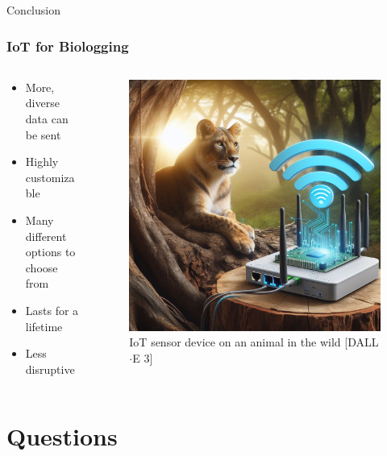 \documentclass{beamer}
\begin{document}
\begin{frame}{Conclusion}
  \frametitle{IoT for Biologging}
  \begin{columns}
    \begin{column}{0.5\textwidth}
      \begin{itemize}
        \item More, diverse data can be sent
        \item Highly customizable
        \item Many different options to choose from
        \item Lasts for a lifetime
        \item Less disruptive
      \end{itemize}
    \end{column}
    \begin{column}{0.5\textwidth}
      \begin{figure}[htbp]
        \centering
        \includegraphics[width=.9\textwidth]{IoT_Lion.jpg}
        \caption{IoT sensor device on an animal in the wild [DALL$\cdot$E 3]}
        \label{fig:IoT_Lion}
      \end{figure}
    \end{column}
  \end{columns}
\end{frame}

\section{Questions}
\end{document}
